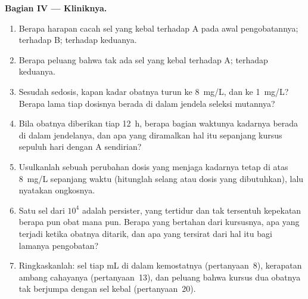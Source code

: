 \begin{problem}
\medskip
\noindent\textbf{Bagian IV --- Kliniknya.}
\begin{enumerate}[resume]
  \item Berapa harapan cacah sel yang kebal terhadap A pada awal
        pengobatannya; terhadap B; terhadap keduanya.
  \item Berapa peluang bahwa tak ada sel yang kebal terhadap A; terhadap keduanya.
  \item Sesudah sedosis, kapan kadar obatnya turun ke \qty{8}{mg/L},
        dan ke \qty{1}{mg/L}? Berapa lama tiap dosisnya berada di dalam
        jendela seleksi mutannya?
  \item Bila obatnya diberikan tiap \qty{12}{h}, berapa bagian
        waktunya kadarnya berada di dalam jendelanya, dan apa yang diramalkan
        hal itu sepanjang kursus sepuluh hari dengan A sendirian?
  \item Usulkanlah sebuah perubahan dosis yang menjaga kadarnya tetap di atas
        \qty{8}{mg/L} sepanjang waktu (hitunglah selang atau dosis yang
        dibutuhkan), lalu nyatakan ongkosnya.
  \item Satu sel dari $10^{4}$ adalah persister, yang tertidur dan tak
        tersentuh kepekatan berapa pun obat mana pun. Berapa yang bertahan dari
        kursusnya, apa yang terjadi ketika obatnya ditarik, dan apa yang
        tersirat dari hal itu bagi lamanya pengobatan?
  \item Ringkaskanlah: sel tiap mL di dalam kemostatnya (pertanyaan~8),
        kerapatan ambang cahayanya (pertanyaan~13), dan peluang bahwa
        kursus dua obatnya tak berjumpa dengan sel kebal (pertanyaan~20).
\end{enumerate}
\end{problem}
